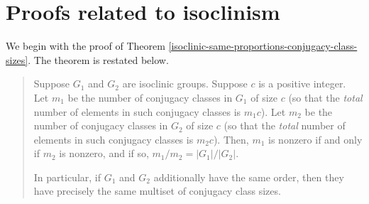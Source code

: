 






 


\section{Proofs related to isoclinism}\label{appsec:isoclinism-extra-proofs}

We begin with the proof of Theorem
\ref{isoclinic-same-proportions-conjugacy-class-sizes}. The theorem is
restated below.

\begin{quote}
  Suppose $G_1$ and $G_2$ are isoclinic groups. Suppose $c$ is a
  positive integer. Let $m_1$ be the number of conjugacy classes in
  $G_1$ of size $c$ (so that the {\em total} number of elements in
  such conjugacy classes is $m_1c$). Let $m_2$ be the number of
  conjugacy classes in $G_2$ of size $c$ (so that the {\em total}
  number of elements in such conjugacy classes is $m_2c$). Then, $m_1$
  is nonzero if and only if $m_2$ is nonzero, and if so, $m_1/m_2 =
  |G_1|/|G_2|$.

  In particular, if $G_1$ and $G_2$ additionally have the same order,
  then they have precisely the same multiset of conjugacy class sizes.

\end{quote}

